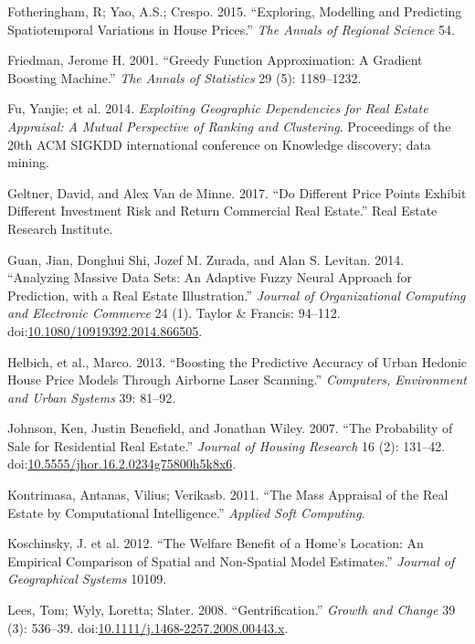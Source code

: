 \documentclass[]{article}
\begin{document}
\hypertarget{ref-Fotheringham2015}{}
Fotheringham, R; Yao, A.S.; Crespo. 2015. ``Exploring, Modelling and
Predicting Spatiotemporal Variations in House Prices.'' \emph{The Annals
of Regional Science} 54.

\hypertarget{ref-Friedman2001}{}
Friedman, Jerome H. 2001. ``Greedy Function Approximation: A Gradient
Boosting Machine.'' \emph{The Annals of Statistics} 29 (5): 1189--1232.

\hypertarget{ref-Fu2014}{}
Fu, Yanjie; et al. 2014. \emph{Exploiting Geographic Dependencies for
Real Estate Appraisal: A Mutual Perspective of Ranking and Clustering}.
Proceedings of the 20th ACM SIGKDD international conference on Knowledge
discovery; data mining.

\hypertarget{ref-Geltner2017}{}
Geltner, David, and Alex Van de Minne. 2017. ``Do Different Price Points
Exhibit Different Investment Risk and Return Commercial Real Estate.''
Real Estate Research Institute.

\hypertarget{ref-Guan2014}{}
Guan, Jian, Donghui Shi, Jozef M. Zurada, and Alan S. Levitan. 2014.
``Analyzing Massive Data Sets: An Adaptive Fuzzy Neural Approach for
Prediction, with a Real Estate Illustration.'' \emph{Journal of
Organizational Computing and Electronic Commerce} 24 (1). Taylor \&
Francis: 94--112.
doi:\href{https://doi.org/10.1080/10919392.2014.866505}{10.1080/10919392.2014.866505}.

\hypertarget{ref-Helbich2013}{}
Helbich, et al., Marco. 2013. ``Boosting the Predictive Accuracy of
Urban Hedonic House Price Models Through Airborne Laser Scanning.''
\emph{Computers, Environment and Urban Systems} 39: 81--92.

\hypertarget{ref-Johnson2007}{}
Johnson, Ken, Justin Benefield, and Jonathan Wiley. 2007. ``The
Probability of Sale for Residential Real Estate.'' \emph{Journal of
Housing Research} 16 (2): 131--42.
doi:\href{https://doi.org/10.5555/jhor.16.2.0234g75800h5k8x6}{10.5555/jhor.16.2.0234g75800h5k8x6}.

\hypertarget{ref-Kontrimasa2011}{}
Kontrimasa, Antanas, Vilius; Verikasb. 2011. ``The Mass Appraisal of the
Real Estate by Computational Intelligence.'' \emph{Applied Soft
Computing}.

\hypertarget{ref-Koschinsky2012}{}
Koschinsky, J. et al. 2012. ``The Welfare Benefit of a Home's Location:
An Empirical Comparison of Spatial and Non-Spatial Model Estimates.''
\emph{Journal of Geographical Systems} 10109.

\hypertarget{ref-Lees2008}{}
Lees, Tom; Wyly, Loretta; Slater. 2008. ``Gentrification.'' \emph{Growth
and Change} 39 (3): 536--39.
doi:\href{https://doi.org/10.1111/j.1468-2257.2008.00443.x}{10.1111/j.1468-2257.2008.00443.x}.
\end{document}
